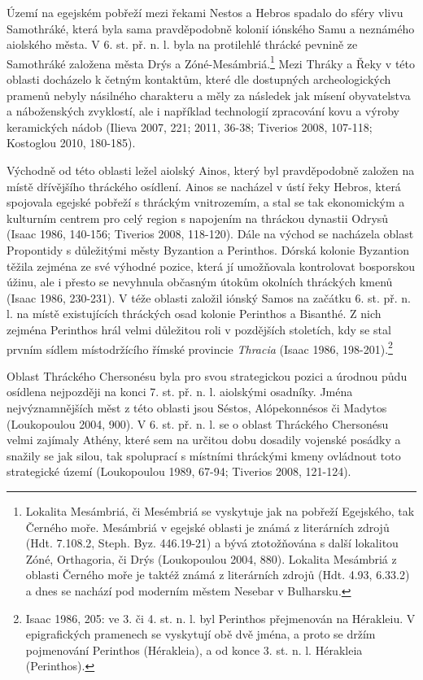Území na egejském pobřeží mezi řekami Nestos a Hebros spadalo do sféry vlivu Samothráké, která byla sama pravděpodobně kolonií iónského Samu a neznámého aiolského města. V 6. st. př. n. l. byla na protilehlé thrácké pevnině ze Samothráké založena města Drýs a Zóné-Mesámbriá.\footnote{Lokalita Mesámbriá, či Mesémbriá se vyskytuje jak na pobřeží Egejského, tak Černého moře. Mesámbriá v egejské oblasti je známá z literárních zdrojů (Hdt. 7.108.2, Steph. Byz. 446.19-21) a bývá ztotožňována s další lokalitou Zóné, Orthagoria, či Drýs (Loukopoulou 2004, 880). Lokalita Mesámbriá z oblasti Černého moře je taktéž známá z literárních zdrojů (Hdt. 4.93, 6.33.2) a dnes se nachází pod moderním městem Nesebar v Bulharsku.} Mezi Thráky a Řeky v této oblasti docházelo k četným kontaktům, které dle dostupných archeologických pramenů nebyly násilného charakteru a měly za následek jak mísení obyvatelstva a náboženských zvyklostí, ale i například technologií zpracování kovu a výroby keramických nádob (Ilieva 2007, 221; 2011, 36-38; Tiverios 2008, 107-118; Kostoglou 2010, 180-185).

Východně od této oblasti ležel aiolský Ainos, který byl pravděpodobně založen na místě dřívějšího thráckého osídlení. Ainos se nacházel v ústí řeky Hebros, která spojovala egejské pobřeží s thráckým vnitrozemím, a stal se tak ekonomickým a kulturním centrem pro celý region s napojením na thráckou dynastii Odrysů (Isaac 1986, 140-156; Tiverios 2008, 118-120). Dále na východ se nacházela oblast Propontidy s důležitými městy Byzantion a Perinthos. Dórská kolonie Byzantion těžila zejména ze své výhodné pozice, která jí umožňovala kontrolovat bosporskou úžinu, ale i přesto se nevyhnula občasným útokům okolních thráckých kmenů (Isaac 1986, 230-231). V téže oblasti založil iónský Samos na začátku 6. st. př. n. l. na místě existujících thráckých osad kolonie Perinthos a Bisanthé. Z nich zejména Perinthos hrál velmi důležitou roli v pozdějších stoletích, kdy se stal prvním sídlem místodržícího římské provincie {\em Thracia} (Isaac 1986, 198-201).\footnote{Isaac 1986, 205: ve 3. či 4. st. n. l. byl Perinthos přejmenován na Hérakleiu. V epigrafických pramenech se vyskytují obě dvě jména, a proto se držím pojmenování Perinthos (Hérakleia), a od konce 3. st. n. l. Hérakleia (Perinthos).}

Oblast Thráckého Chersonésu byla pro svou strategickou pozici a úrodnou půdu osídlena nejpozději na konci 7. st. př. n. l. aiolskými osadníky. Jména nejvýznamnějších měst z této oblasti jsou Séstos, Alópekonnésos či Madytos (Loukopoulou 2004, 900). V 6. st. př. n. l. se o oblast Thráckého Chersonésu velmi zajímaly Athény, které sem na určitou dobu dosadily vojenské posádky a snažily se jak silou, tak spoluprací s místními thráckými kmeny ovládnout toto strategické území (Loukopoulou 1989, 67-94; Tiverios 2008, 121-124).

